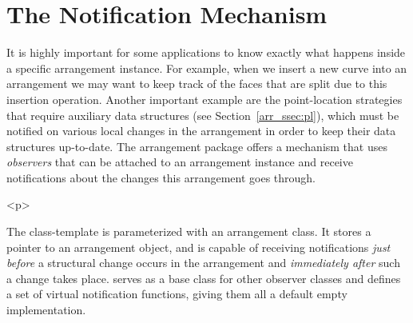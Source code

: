 \section{The Notification Mechanism}
\label{arr_sec:notif}
%
It is highly important for some applications to know exactly what
happens inside a specific arrangement instance. For example, when
we insert a new curve into an arrangement we may want to keep
track of the faces that are split due to this insertion operation.
Another important example are the point-location strategies that
require auxiliary data structures (see Section~\ref{arr_ssec:pl}),
which must be notified on various local changes in the arrangement
in order to keep their data structures up-to-date. The arrangement
package offers a mechanism that uses {\em observers} that can be
attached to an arrangement instance and receive notifications
about the changes this arrangement goes through.

\begin{ccHtmlOnly}<p>\end{ccHtmlOnly}
The  class-template is
parameterized with an arrangement class. It stores a pointer to an
arrangement object, and is capable of receiving notifications {\em
just before} a structural change occurs in the arrangement and
{\em immediately after} such a change takes place.
 serves as a base class for other observer
classes and defines a set of virtual notification functions,
giving them all a default empty implementation.

